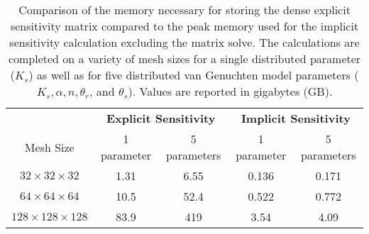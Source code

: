 \begin{table}[!ht]
\centering
\caption{Comparison of the memory necessary for storing the dense explicit sensitivity matrix compared to the peak memory used for the implicit sensitivity calculation excluding the matrix solve. The calculations are completed on a variety of mesh sizes for a single distributed parameter ($K_s$) as well as for five distributed van Genuchten model parameters ($K_s, \alpha, n, \theta_r$, and $\theta_s$). Values are reported in gigabytes (GB).}
\begin{tabular}{*{5}c}
\hline
 &   \multicolumn{2}{c}{\bf Explicit Sensitivity} &    \multicolumn{2}{c}{\bf Implicit Sensitivity}  \\
Mesh Size & 1 parameter & 5 parameters & 1 parameter & 5 parameters  \\
\hline
$32 \times 32 \times 32$    & 1.31 &  6.55 &  0.136 & 0.171\\
$64 \times 64 \times 64$    & 10.5 &  52.4 &  0.522 & 0.772\\
$128 \times 128 \times 128$ & 83.9 &  419  &  3.54  & 4.09 \\
\hline
\end{tabular}
\label{table:richards-sensitivity}
\end{table}




